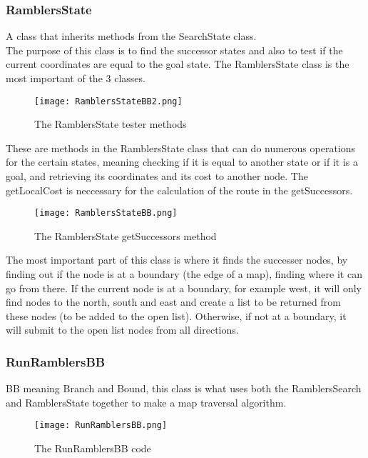 \documentclass[11pt,oneside]{article}
\begin{document}
\subsubsection{RamblersState}
A class that inherits methods from the SearchState class. \\The purpose of this class is to find the successor states and also to test if the current coordinates are equal to the goal state. The RamblersState class is the most important of the 3 classes. \\

\begin{figure}[!ht]
\centering
  \texttt{[image: RamblersStateBB2.png]}
  \caption{The RamblersState tester methods}
  \label{fig:RamblersStateBB2}
\end{figure}

\pagebreak

These are methods in the RamblersState class that can do numerous operations for the certain states, meaning checking if it is equal to another state or if it is a goal, and retrieving its coordinates and its cost to another node. The getLocalCost is neccessary for the calculation of the route in the getSuccessors.

\begin{figure}[!ht]
\centering
  \texttt{[image: RamblersStateBB.png]}
  \caption{The RamblersState getSuccessors method}
  \label{fig:RamblersStateBB}
\end{figure}

The most important part of this class is where it finds the successer nodes, by finding out if the node is at a boundary (the edge of a map), finding where it can go from there. If the current node is at a boundary, for example west, it will only find nodes to the north, south and east and create a list to be returned from these nodes (to be added to the open list). Otherwise, if not at a boundary, it will submit to the open list nodes from all directions. 

\subsubsection{RunRamblersBB}

BB meaning Branch and Bound, this class is what uses both the RamblersSearch and RamblersState together to make a map traversal algorithm.

\begin{figure}[!ht]
\centering
  \texttt{[image: RunRamblersBB.png]}
  \caption{The RunRamblersBB code}
  \label{fig:RunRamblersBB}
\end{figure}
\end{document}
